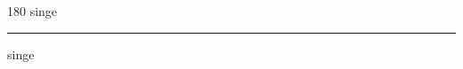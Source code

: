 
\begin{frame}
\begin{center}
\begin{turn}{180}
{\fontsize{2.5cm}{1em}\selectfont singe}
\end{turn}
\vspace{1em}\par  
\hrule
\vspace{1em}\par  
{\fontsize{2.5cm}{1em}\selectfont singe}
\end{center}
\end{frame}
